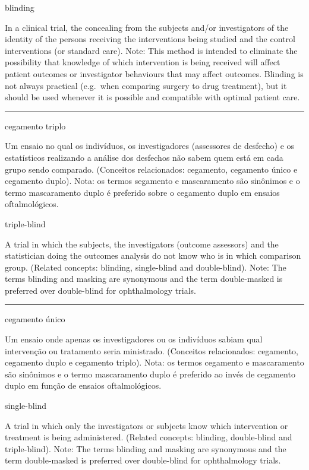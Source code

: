 \documentclass[
  openany]{book}
\begin{document}
blinding

In a clinical trial, the concealing from the subjects and/or investigators of the identity of the persons receiving the interventions being studied and the control interventions (or standard care). Note: This method is intended to eliminate the possibility that knowledge of which intervention is being received will affect patient outcomes or investigator behaviours that may affect outcomes. Blinding is not always practical (e.g.~when comparing surgery to drug treatment), but it should be used whenever it is possible and compatible with optimal patient care.

\begin{center}\rule{0.5\linewidth}{0.5pt}\end{center}

cegamento triplo

Um ensaio no qual os indivíduos, os investigadores (assessores de desfecho) e os estatísticos realizando a análise dos desfechos não sabem quem está em cada grupo sendo comparado. (Conceitos relacionados: cegamento, cegamento único e cegamento duplo). Nota: os termos segamento e mascaramento são sinônimos e o termo mascaramento duplo é preferido sobre o cegamento duplo em ensaios oftalmológicos.

triple-blind

A trial in which the subjects, the investigators (outcome assessors) and the statistician doing the outcomes analysis do not know who is in which comparison group. (Related concepts: blinding, single-blind and double-blind). Note: The terms blinding and masking are synonymous and the term double-masked is preferred over double-blind for ophthalmology trials.

\begin{center}\rule{0.5\linewidth}{0.5pt}\end{center}

cegamento único

Um ensaio onde apenas os investigadores ou os indivíduos sabiam qual intervenção ou tratamento seria ministrado. (Conceitos relacionados: cegamento, cegamento duplo e cegamento triplo). Nota: os termos cegamento e mascaramento são sinônimos e o termo mascaramento duplo é preferido ao invés de cegamento duplo em função de ensaios oftalmológicos.

single-blind

A trial in which only the investigators or subjects know which intervention or treatment is being administered. (Related concepts: blinding, double-blind and triple-blind). Note: The terms blinding and masking are synonymous and the term double-masked is preferred over double-blind for ophthalmology trials.
\end{document}
